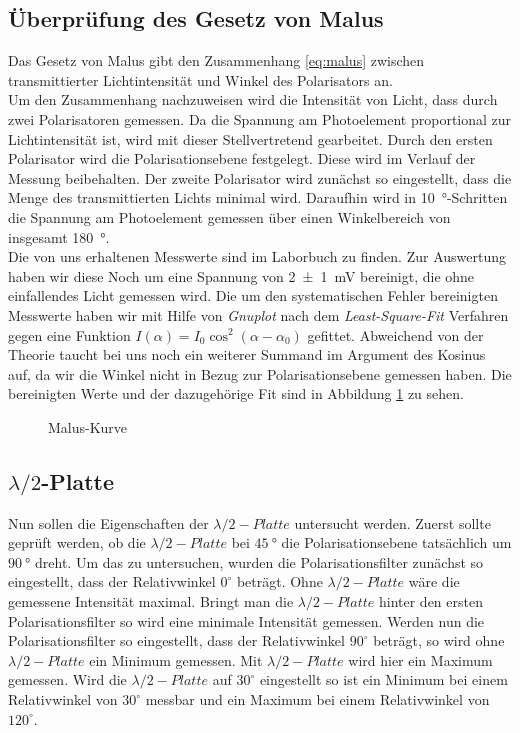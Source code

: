 \subsection{Überprüfung des Gesetz von Malus}
Das Gesetz von Malus gibt den Zusammenhang \eqref{eq:malus} zwischen transmittierter Lichtintensität und Winkel des Polarisators an.\\
Um den Zusammenhang nachzuweisen wird die Intensität von Licht, dass durch zwei Polarisatoren
gemessen. Da die Spannung am Photoelement proportional zur Lichtintensität ist, wird mit dieser Stellvertretend gearbeitet. Durch den ersten Polarisator wird die Polarisationsebene festgelegt. Diese wird im Verlauf der Messung beibehalten. Der zweite Polarisator wird zunächst so eingestellt, dass die Menge des transmittierten Lichts minimal wird. Daraufhin wird in \SI{10}{\degree}-Schritten die Spannung am Photoelement gemessen über einen Winkelbereich von insgesamt \SI{180}{\degree}.\\
Die von uns erhaltenen Messwerte sind im Laborbuch zu finden. Zur Auswertung haben wir diese Noch um eine Spannung von \SI{2+-1}{mV} bereinigt, die ohne einfallendes Licht gemessen wird.
Die um den systematischen Fehler bereinigten Messwerte haben wir mit Hilfe von \textit{Gnuplot} nach dem \textit{Least-Square-Fit} Verfahren gegen eine Funktion $ I(\alpha)  = I_0 \cos^2(\alpha-\alpha_0)$ gefittet. Abweichend von der Theorie taucht bei uns noch ein weiterer Summand im Argument des Kosinus auf, da wir die Winkel nicht in Bezug zur Polarisationsebene gemessen haben. Die bereinigten Werte und der dazugehörige Fit sind in Abbildung \ref{fig:malus} zu sehen.
\begin{figure}[H]
\centering
\def\h{10cm}

\caption{Malus-Kurve}
\label{fig:malus}
\end{figure}
\subsection{$ \lambda/2 $-Platte}
Nun sollen die Eigenschaften der $ \lambda /2 -Platte $ untersucht werden.
Zuerst sollte geprüft werden, ob die $ \lambda /2 -Platte $ bei $ \SI{45}{\degree} $ die Polarisationsebene tatsächlich um $ \SI{90}{\degree} $ dreht. Um das zu untersuchen, wurden die Polarisationsfilter zunächst so eingestellt, dass der Relativwinkel $ 0^\circ $ beträgt. Ohne $ \lambda /2 -Platte $ wäre die gemessene Intensität maximal. Bringt man die $ \lambda /2 -Platte $ hinter den ersten Polarisationsfilter so wird eine minimale Intensität gemessen. Werden nun die Polarisationsfilter so eingestellt, dass der Relativwinkel $ 90^\circ $ beträgt, so wird ohne $ \lambda /2 -Platte $ ein Minimum gemessen. Mit $ \lambda /2 -Platte $ wird hier ein Maximum gemessen.
Wird die $ \lambda /2 -Platte $ auf $ 30^\circ $ eingestellt so ist ein Minimum bei einem Relativwinkel von $ 30^\circ $ messbar und ein Maximum bei einem Relativwinkel von $ 120^\circ $.

